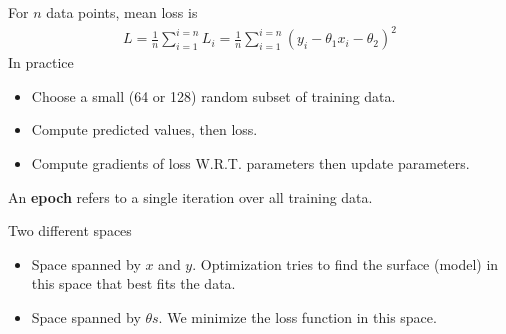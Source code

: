 \begin{frame}%
	For $n$ data points, mean  loss is 
	\begin{align*}
		L = \frac{1}{n} \sum_{i=1}^{i=n}L_i  
		  = \frac{1}{n} \sum_{i=1}^{i=n} (y_i-\theta_1 x_i-\theta_2)^2
	\end{align*}
	In practice
	\begin{itemize}
		\item Choose a small (64 or 128) random subset of training data. 
		\item Compute predicted values, then loss.
		\item Compute gradients of loss  W.R.T. parameters then update parameters. 
	\end{itemize}
	An  {\bf epoch} refers to a single iteration over all training data.
	\begin{block}{Two different spaces}
		\begin{itemize}
			\item Space spanned by $x$ and $y$. Optimization tries to find the surface (model) 
			in this space that best fits the data. 
			\item Space spanned by $\theta s$. We minimize the loss function in this space.  
		\end{itemize}
	\end{block}
\end{frame}


